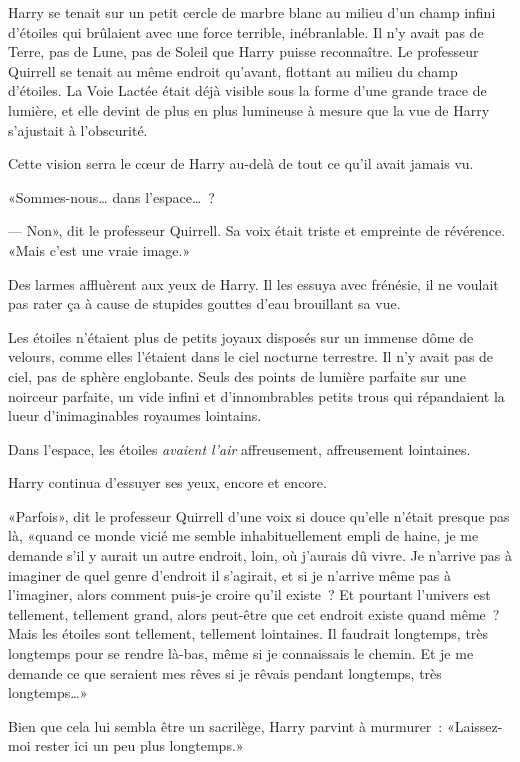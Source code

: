 Harry se tenait sur un petit cercle de marbre blanc au milieu d'un champ infini d'étoiles qui brûlaient avec une force terrible, inébranlable. Il n'y avait pas de Terre, pas de Lune, pas de Soleil que Harry puisse reconnaître. Le professeur Quirrell se tenait au même endroit qu'avant, flottant au milieu du champ d'étoiles. La Voie Lactée était déjà visible sous la forme d'une grande trace de lumière, et elle devint de plus en plus lumineuse à mesure que la vue de Harry s'ajustait à l'obscurité.

Cette vision serra le cœur de Harry au-delà de tout ce qu'il avait jamais vu.

«Sommes-nous… dans l'espace…~?

--- Non», dit le professeur Quirrell. Sa voix était triste et empreinte de révérence. «Mais c'est une vraie image.»

Des larmes affluèrent aux yeux de Harry. Il les essuya avec frénésie, il ne voulait pas rater ça à cause de stupides gouttes d'eau brouillant sa vue.

Les étoiles n'étaient plus de petits joyaux disposés sur un immense dôme de velours, comme elles l'étaient dans le ciel nocturne terrestre. Il n'y avait pas de ciel, pas de sphère englobante. Seuls des points de lumière parfaite sur une noirceur parfaite, un vide infini et d'innombrables petits trous qui répandaient la lueur d'inimaginables royaumes lointains.

Dans l'espace, les étoiles \emph{avaient l'air} affreusement, affreusement lointaines.

Harry continua d'essuyer ses yeux, encore et encore.

«Parfois», dit le professeur Quirrell d'une voix si douce qu'elle n'était presque pas là, «quand ce monde vicié me semble inhabituellement empli de haine, je me demande s'il y aurait un autre endroit, loin, où j'aurais dû vivre. Je n'arrive pas à imaginer de quel genre d'endroit il s'agirait, et si je n'arrive même pas à l'imaginer, alors comment puis-je croire qu'il existe~? Et pourtant l'univers est tellement, tellement grand, alors peut-être que cet endroit existe quand même~? Mais les étoiles sont tellement, tellement lointaines. Il faudrait longtemps, très longtemps pour se rendre là-bas, même si je connaissais le chemin. Et je me demande ce que seraient mes rêves si je rêvais pendant longtemps, très longtemps…»

Bien que cela lui sembla être un sacrilège, Harry parvint à murmurer~: «Laissez-moi rester ici un peu plus longtemps.»

